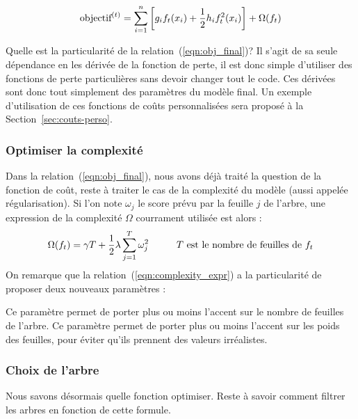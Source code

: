 \begin{equation}
\textnormal{objectif}^{(t)}=\sum_{i=1}^n\left[g_if_t(x_i)+\frac{1}{2}h_if_t^2(x_i)\right]+\Omega(f_t)
\label{eqn:obj_final}
\end{equation}

Quelle est la particularité de la relation~(\ref{eqn:obj_final})? Il s'agit de sa seule dépendance en les dérivée de la fonction de perte, il est donc simple d'utiliser des fonctions de perte particulières sans devoir changer tout le code. Ces dérivées sont donc tout simplement des paramètres du modèle final. Un exemple d'utilisation de ces fonctions de coûts personnalisées sera proposé à la Section~\ref{sec:couts-perso}.

\subsubsection{Optimiser la complexité}
\label{sec:opt_complexity}
Dans la relation~(\ref{eqn:obj_final}), nous avons déjà traité la question de la fonction de coût, reste à traiter le cas de la complexité du modèle (aussi appelée régularisation). Si l'on note $\omega_j$ le score prévu par la feuille $j$ de l'arbre, une expression de la complexité $\Omega$ courrament utilisée est alors :
\begin{equation}
\Omega(f_t)=\gamma T+\frac{1}{2}\lambda\sum_{j=1}^T\omega_j^2\hspace{1cm}\textnormal{$T$ est le nombre de feuilles de $f_t$}
\label{eqn:complexity_expr}
\end{equation}
On remarque que la relation~(\ref{eqn:complexity_expr}) a la particularité de proposer deux nouveaux paramètres :
\begin{itemize}
	\itemperso{$\gamma$}Ce paramètre permet de porter plus ou moins l'accent sur le nombre de feuilles de l'arbre.
	\itemperso{$\lambda$}Ce paramètre permet de porter plus ou moins l'accent sur les poids des feuilles, pour éviter qu'ils prennent des valeurs irréalistes.
\end{itemize}

\subsubsection{Choix de l'arbre}
Nous savons désormais quelle fonction optimiser. Reste à savoir comment filtrer les arbres en fonction de cette formule.

